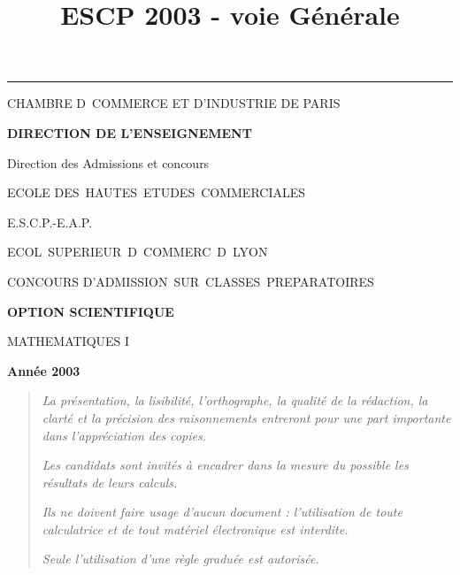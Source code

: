 \documentclass[11pt]{article}%
\title{\bf \vspace{-2cm} ESCP 2003 - voie Générale} %
\author{} %
\date{} %
\begin{document}
\maketitle %
\vspace{-1.4cm}\hrule %
\thispagestyle{fancy}

\vspace*{.2cm}




\begin{center}
{\small CHAMBRE D\E\ COMMERCE ET D'INDUSTRIE DE PARIS}

\textbf{DIRECTION DE L'ENSEIGNEMENT}

Direction des Admissions et concours

\underline{\hspace*{3cm}}

{\Large ECOLE DES\ HAUTES\ ETUDES\ COMMERCIALES}

{\Large E.S.C.P.-E.A.P.}

{\Large ECOL\E\ SUPERIEUR\E\ D\E\ COMMERC\E\ D\E\ LYON}{\large }

CONCOURS D'ADMISSION\ SUR\ CLASSES\ PREPARATOIRES

\underline{\hspace*{3cm}}

\textbf{OPTION SCIENTIFIQUE}

{\Large MATHEMATIQUES I}

\textbf{Année 2003}

\underline{\hspace*{3cm}}
\end{center}

\begin{quotation}
\noindent \textsl{La présentation, la lisibilité, l'orthographe, la
qualité
de la rédaction, la clarté et la précision des raisonnements entreront
pour
une part importante dans l'appréciation des copies.}

\noindent \textsl{Les candidats sont invités à encadrer dans la mesure
du
possible les résultats de leurs calculs.}

\noindent \textsl{Ils ne doivent faire usage d'aucun document :
l'utilisation de toute calculatrice et de tout matériel électronique
est
interdite.}

\noindent \textsl{Seule l'utilisation d'une règle graduée est
autorisée.}

\noindent \textsl{\hrulefill }
\end{quotation}
\end{document}
